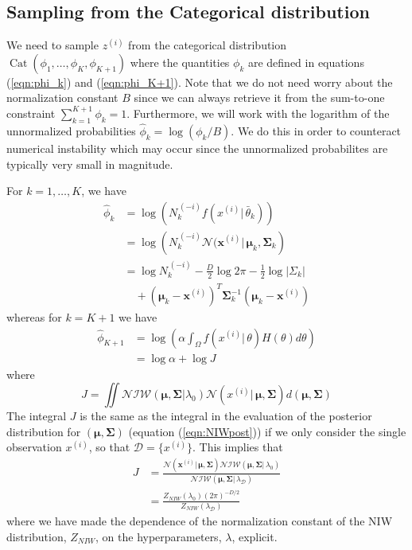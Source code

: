\documentclass[final,3p,times,twocolumn]{elsarticle}
\DeclareMathOperator*{\Cat}{Cat}
\let\bs\boldsymbol
\begin{document}
\subsection{Sampling from the Categorical distribution}
We need to sample $z^{(i)}$ from the categorical distribution $\Cat(\phi_1,\dots,\phi_K,\phi_{K+1})$ where the quantities $\phi_k$ are defined in equations (\ref{eqn:phi_k}) and (\ref{eqn:phi_K+1}).
Note that we do not need worry about the normalization constant $B$ since we can always retrieve it from the sum-to-one constraint $\sum_{k=1}^{K+1}\phi_k=1$.
Furthermore, we will work with the logarithm of the unnormalized probabilities $\hat\phi_k = \log(\phi_k/B)$.
We do this in order to counteract numerical instability which may occur since the unnormalized probabilites are typically very small in magnitude. 

For $k=1,\dots,K$, we have
\begin{equation}
\begin{split}
\hat\phi_k &= \log\left(N^{\,(-i)}_k f(x^{(i)}|\,\bar\theta_k)\right)\\
&= \log\left(N^{\,(-i)}_k \mathcal{N}(\bs x^{(i)}|\,\bs\mu_k,\bs\Sigma_k\right)\\
&= \log N^{\,(-i)}_k -\frac{D}{2}\log2\pi -\frac{1}{2}\log|\Sigma_k|\\
&\quad+ (\bs\mu_k-\bs x^{(i)})^T\bs\Sigma_k^{-1}(\bs\mu_k-\bs x^{(i)})
\end{split}
\end{equation}
whereas for $k=K+1$ we have
\begin{equation}
\begin{split}
\hat\phi_{K+1} &= \log\left(\alpha\int_\Omega f(x^{(i)}|\,\theta)H(\theta)d\theta\right)\\
&=\log\alpha+\log J
\end{split}
\end{equation}
where
\begin{equation}
J = \iint\mathcal{NIW}(\bs\mu,\bs\Sigma|\lambda_0)\mathcal{N}(x^{(i)}|\,\bs\mu,\bs\Sigma)d(\bs\mu,\bs\Sigma)
\end{equation}
The integral $J$ is the same as the integral in the evaluation of the posterior distribution for $(\bs\mu,\bs\Sigma)$ (equation (\ref{eqn:NIWpost})) if we only consider the single observation $x^{(i)}$, so that $\mathcal{D}=\{x^{(i)}\}$.
This implies that
\begin{equation}
\begin{split}
J &= \frac{\mathcal{N}(\bs x^{(i)}|\,\bs\mu,\bs\Sigma)\mathcal{NIW}(\bs\mu,\bs\Sigma|\,\lambda_0)}{\mathcal{NIW}(\bs\mu,\bs\Sigma|\,\lambda_\mathcal{D})}\\
&= \frac{Z_{NIW}(\lambda_0) (2\pi)^{-D/2}}{Z_{NIW}(\lambda_\mathcal{D})}
\end{split}
\end{equation}
where we have made the dependence of the normalization constant of the NIW distribution, $Z_{NIW}$, on the hyperparameters, $\lambda$, explicit.
\end{document}
